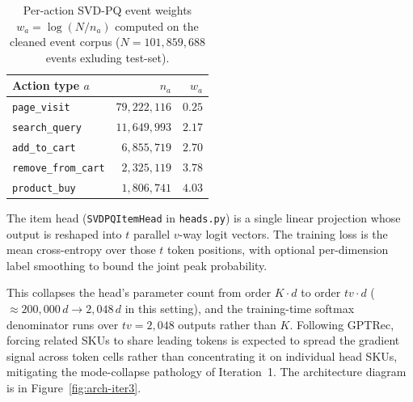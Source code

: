 \documentclass[sigconf,nonacm]{acmart}
\begin{document}
\begin{table}[h]
\centering
\caption{Per-action SVD-PQ event weights $w_a = \log(N / n_a)$
computed on the cleaned event corpus ($N = 101{,}859{,}688$ events exluding test-set).}
\label{tab:svdpq-event-weights}
\small
\begin{tabular}{@{}l r r@{}}
\toprule
Action type $a$ & $n_a$ & $w_a$ \\
\midrule
\texttt{page\_visit}        & $79{,}222{,}116$ & $0.25$ \\
\texttt{search\_query}      & $11{,}649{,}993$ & $2.17$ \\
\texttt{add\_to\_cart}      &  $6{,}855{,}719$ & $2.70$ \\
\texttt{remove\_from\_cart} &  $2{,}325{,}119$ & $3.78$ \\
\texttt{product\_buy}       &  $1{,}806{,}741$ & $4.03$ \\
\bottomrule
\end{tabular}
\end{table}

The item head (\texttt{SVDPQItemHead} in \texttt{heads.py}) is a single
linear projection whose output is reshaped into $t$ parallel $v$-way logit
vectors. The training loss is the mean cross-entropy over those $t$
token positions, with optional per-dimension label smoothing to bound the
joint peak probability.

This collapses the head's parameter count from order $K\!\cdot\! d$ to
order $t v\!\cdot\! d$ ($\approx 200{,}000\,d \rightarrow 2{,}048\,d$ in
this setting), and the training-time softmax denominator runs over
$tv = 2{,}048$ outputs rather than $K$. Following GPTRec,
forcing related SKUs to share leading tokens is expected to spread the
gradient signal across token cells rather than concentrating it on
individual head SKUs, mitigating the mode-collapse pathology of
Iteration~1. The architecture diagram is in
Figure~\ref{fig:arch-iter3}.
\end{document}

